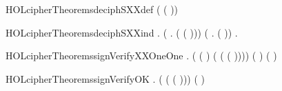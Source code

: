 \newcommand{\HOLcipherTheoremsdeciphSXXclauses}{\UseVerbatim{HOLcipherTheoremsdeciphSXXclauses}}
\begin{SaveVerbatim}{HOLcipherTheoremsdeciphSXXdef}
\HOLTokenTurnstile{}   (  ( )) \HOLSymConst{=}
     \HOLSymConst{=}      
\end{SaveVerbatim}
\newcommand{\HOLcipherTheoremsdeciphSXXdef}{\UseVerbatim{HOLcipherTheoremsdeciphSXXdef}}
\begin{SaveVerbatim}{HOLcipherTheoremsdeciphSXXind}
\HOLTokenTurnstile{} \HOLSymConst{\HOLTokenForall{}}.
     (\HOLSymConst{\HOLTokenForall{}}  .   (  ( ))) \HOLSymConst{\HOLTokenConj{}}
     (\HOLSymConst{\HOLTokenForall{}} .   (  )) \HOLSymConst{\HOLTokenImp{}}
     \HOLSymConst{\HOLTokenForall{}} .   
\end{SaveVerbatim}
\newcommand{\HOLcipherTheoremsdeciphSXXind}{\UseVerbatim{HOLcipherTheoremsdeciphSXXind}}
\begin{SaveVerbatim}{HOLcipherTheoremssignVerifyXXOneOne}
\HOLTokenTurnstile{} \HOLSymConst{\HOLTokenForall{}}  .
       ( ( ) ( ( ( ))))
       ( ) \HOLSymConst{\HOLTokenEquiv{}} ( \HOLSymConst{=} )
\end{SaveVerbatim}
\newcommand{\HOLcipherTheoremssignVerifyXXOneOne}{\UseVerbatim{HOLcipherTheoremssignVerifyXXOneOne}}
\begin{SaveVerbatim}{HOLcipherTheoremssignVerifyOK}
\HOLTokenTurnstile{} \HOLSymConst{\HOLTokenForall{}} .   (  ( ( ))) ( )
\end{SaveVerbatim}
